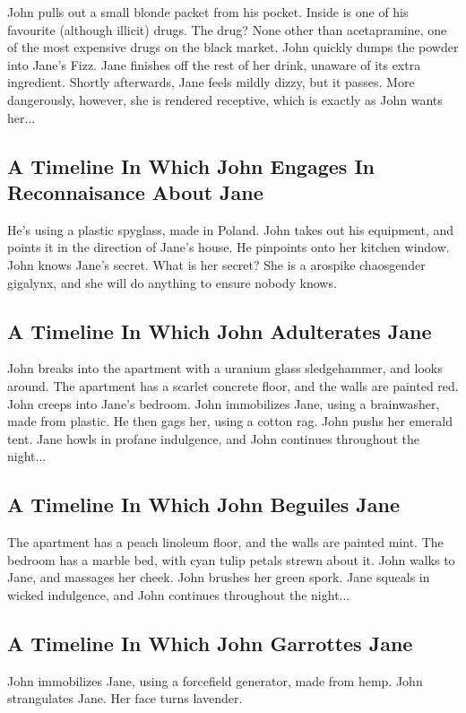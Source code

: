 \documentclass{article}
\begin{document}
John pulls out a small blonde packet from his pocket. Inside is one of his favourite (although illicit) drugs.
The drug? None other than acetapramine, one of the most expensive drugs on the black market.
John quickly dumps the powder into Jane's Fizz.
Jane finishes off the rest of her drink, unaware of its extra ingredient.
Shortly afterwards, Jane feels mildly dizzy, but it passes.
More dangerously, however, she is rendered receptive, which is exactly as John wants her...
\subsection{A Timeline In Which John Engages In Reconnaisance About Jane}


He's using a plastic spyglass, made in Poland.
John takes out his equipment, and points it in the direction of Jane's house. He pinpoints onto her kitchen window.
John knows Jane's secret. What is her secret? She is a arospike chaosgender gigalynx, and she will do anything to ensure nobody knows.
\subsection{A Timeline In Which John Adulterates Jane}


John breaks into the apartment with a uranium glass sledgehammer, and looks around.
The apartment has a scarlet concrete floor, and the walls are painted red.
John creeps into Jane's bedroom.
John immobilizes Jane, using a brainwasher, made from plastic.
He then gags her, using a cotton rag.
John pushs her emerald tent.
Jane howls in profane indulgence, and John continues throughout the night...
\subsection{A Timeline In Which John Beguiles Jane}


The apartment has a peach linoleum floor, and the walls are painted mint.
The bedroom has a marble bed, with cyan tulip petals strewn about it.
John walks to Jane, and massages her cheek.
John brushes her green spork.
Jane squeals in wicked indulgence, and John continues throughout the night...
\subsection{A Timeline In Which John Garrottes Jane}


John immobilizes Jane, using a forcefield generator, made from hemp.
John strangulates Jane.
Her face turns lavender.
\end{document}
